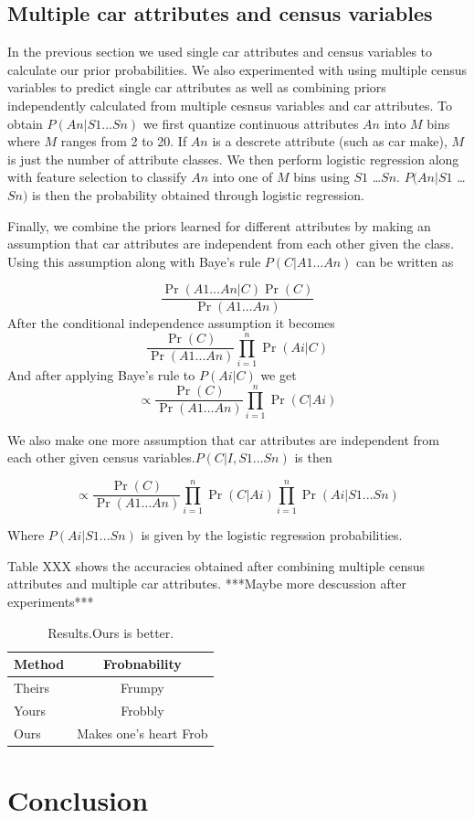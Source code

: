 \documentclass[10pt,twocolumn,letterpaper]{article}
\begin{document}
\subsection{Multiple car attributes and census variables}
In the previous section we used single car attributes and census variables to calculate our prior probabilities. We also experimented with using multiple census variables to predict single car attributes as well as combining priors independently calculated from multiple cesnsus variables and car attributes. To obtain \(P(An|S1...Sn)\) we first quantize continuous attributes \(An\) into \(M\) bins where \(M\) ranges from 2 to 20. If \(An\) is a descrete attribute (such as car make), \(M\) is just the number of attribute classes. We then perform logistic regression along with feature selection to classify \(An\) into one of \(M\) bins using \(S1\) \ldots \(Sn\). \(P(An|S1\) \ldots \(Sn)\) is then the probability obtained through logistic regression.

Finally, we combine the priors learned for different attributes by making an assumption that car attributes are independent from each other given the class. Using this assumption along with Baye's rule \(P(C|A1 \ldots An)\) can be written as 

\begin{equation}
\frac{\Pr(A1\ldots An|C)\Pr(C)}{\Pr(A1\ldots An)}
\end{equation}
After the conditional independence assumption it becomes
\begin{equation}
\frac{\Pr(C)}{\Pr(A1\ldots An)}\prod\limits_{i=1}^n \Pr(Ai|C)
\end{equation}
And after applying Baye's rule to \(P(Ai|C)\) we get 
\begin{equation}
\propto \frac{\Pr(C)}{\Pr(A1\ldots An)}\prod\limits_{i=1}^n \Pr(C|Ai)
\end{equation}

We also make one more assumption that car attributes are independent from each other given census variables.\(P(C|I,S1 \ldots Sn)\) is then  

\begin{equation}
\propto \frac{\Pr(C)}{\Pr(A1\ldots An)}\prod\limits_{i=1}^n \Pr(C|Ai) \prod\limits_{i=1}^n \Pr(Ai|S1...Sn)
\end{equation}

Where \(P(Ai|S1...Sn)\) is given by the logistic regression probabilities.

Table XXX shows the accuracies obtained after combining multiple census attributes and multiple car attributes. ***Maybe more descussion after experiments***
\begin{table}
\begin{center}
\begin{tabular}{|l|c|}
\hline
Method & Frobnability \\
\hline\hline
Theirs & Frumpy \\
Yours & Frobbly \\
Ours & Makes one's heart Frob\\
\hline
\end{tabular}
\end{center}
\caption{Results.Ours is better.}
\label{table:prior-acc}
\end{table}

\section{Conclusion}
{\small


}
\end{document}
